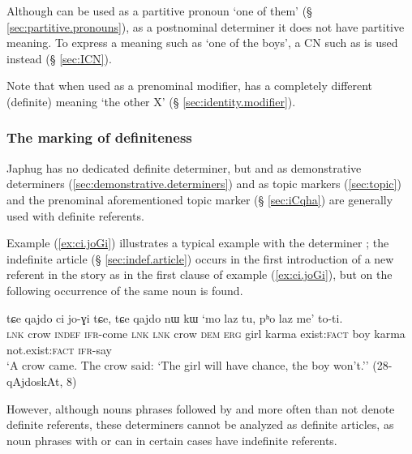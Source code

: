 Although  can be used as a partitive pronoun `one of them' (§ \ref{sec:partitive.pronouns}), as a postnominal determiner it does not have partitive meaning. To express a meaning such as `one of the boys', a CN such as  is used instead (§ \ref{sec:ICN}). 

Note that when used as a prenominal modifier,  has a completely different (definite) meaning `the other X' (§ \ref{sec:identity.modifier}). 

\subsubsection{The marking of definiteness}
Japhug has no dedicated definite determiner, but   and   as demonstrative determiners (\ref{sec:demonstrative.determiners}) and as topic markers (\ref{sec:topic}) and the prenominal aforementioned topic marker  (§ \ref{sec:iCqha}) are generally used with definite referents.  

Example (\ref{ex:ci.joGi}) illustrates a typical example with the determiner ; the indefinite article  (§ \ref{sec:indef.article}) occurs in the first introduction of a new referent in the story as in the first clause of example (\ref{ex:ci.joGi}), but on the following occurrence of the same noun  is found.

\begin{exe}
\ex \label{ex:ci.joGi}
 \gll  tɕe qajdo ci jo-ɣi tɕe, tɕe qajdo nɯ kɯ `mo laz tu, pʰo laz me' to-ti. \\
 \textsc{lnk} crow \textsc{indef} \textsc{ifr}-come \textsc{lnk} \textsc{lnk} crow \textsc{dem} \textsc{erg} girl karma exist:\textsc{fact} boy karma not.exist:\textsc{fact} \textsc{ifr}-say \\
 \glt `A crow came. The crow said: `The girl will have chance, the boy won't.'' (28-qAjdoskAt, 8)
\end{exe}

However, although nouns phrases followed by  and  more often than not denote definite referents, these determiners cannot be analyzed as definite articles, as noun phrases with  or  can in certain cases have indefinite referents. 

